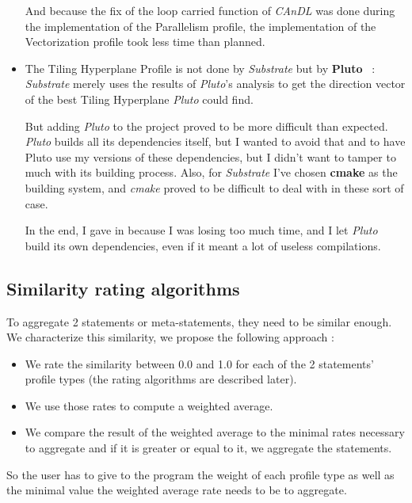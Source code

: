 \documentclass[paper=a4, fontsize=11.5pt]{scrartcl}
\numberwithin{equation}{section}        %
\numberwithin{figure}{section}          %
\numberwithin{table}{section}               %
\begin{document}
\begin{itemize}
            And because the fix of the loop carried function of \textit{CAnDL} was done during
            the implementation of the Parallelism profile, the implementation of the
            Vectorization profile took less time than planned.
        \item The Tiling Hyperplane Profile is not done by \textit{Substrate} but by
            \textbf{Pluto}~\cite{pluto} : \textit{Substrate} merely uses the results of
            \textit{Pluto}'s analysis to get the direction vector of the best Tiling Hyperplane
            \textit{Pluto} could find.

            But adding \textit{Pluto} to the project proved to be more difficult than expected.
            \textit{Pluto} builds all its dependencies itself, but I wanted to avoid that and
            to have Pluto use my versions of these dependencies, but I didn't want to tamper
            to much with its building process. Also, for \textit{Substrate} I've chosen \textbf{cmake}
            as the building system, and \textit{cmake} proved to be difficult to deal with in these
            sort of case.

            In the end, I gave in because I was losing too much time, and I let \textit{Pluto} build
            its own dependencies, even if it meant a lot of useless compilations.
    \end{itemize}
    
    \subsection{Similarity rating algorithms}
    To aggregate 2 statements or meta-statements, they need to be similar enough. We characterize
    this similarity, we propose the following approach :
    \begin{itemize}
        \item We rate the similarity between 0.0 and 1.0 for each of the 2 statements' profile types
            (the rating algorithms are described later).
        \item We use those rates to compute a weighted average.
        \item We compare the result of the weighted average to the minimal rates necessary
            to aggregate and if it is greater or equal to it, we aggregate the statements.
    \end{itemize}
    So the user has to give to the program the weight of each profile type as well as the
    minimal value the weighted average rate needs to be to aggregate.
\end{document}
